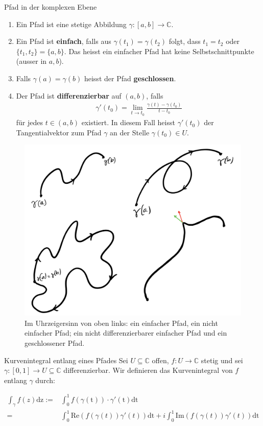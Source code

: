 \documentclass[a4paper,10pt]{article}
\def\Re{\text{Re}}
\def\Im{\text{Im}}
\begin{document}
\begin{mainbox}{Pfad in der komplexen Ebene}
  \begin{enumerate}
    \item Ein Pfad ist eine stetige Abbildung \(\gamma\colon[a,b]\to\mathbb{C}\).
    \item Ein Pfad ist \textbf{einfach}, falls aus \(\gamma(t_1)=\gamma(t_2)\) folgt, dass \(t_1=t_2\) oder \(\{t_1,t_2\}=\{a,b\}\). Das heisst ein einfacher Pfad hat keine Selbstschnittpunkte (ausser in $a,b$).
    \item Falls \(\gamma(a)=\gamma(b)\) heisst der Pfad \textbf{geschlossen}.
    \item Der Pfad ist \textbf{differenzierbar} auf \((a,b)\), falls \begin{align*} \gamma'(t_0)= \lim_{t \to t_0} \frac{\gamma (t) - \gamma (t_0)}{t-t_0} \end{align*} für jedes \(t\in(a,b)\) existiert. In diesem Fall heisst \(\gamma'(t_0)\) der Tangentialvektor zum Pfad \(\gamma\) an der Stelle \(\gamma(t_0)\in U\).
  \end{enumerate}
\end{mainbox}

\begin{figure}[H]
  \centering 
  \includegraphics[width=0.9\linewidth]{assets/paths.png}
  \caption{Im Uhrzeigersinn von oben links: ein einfacher Pfad, ein nicht einfacher Pfad; ein nicht differenzierbarer einfacher Pfad und ein geschlossener Pfad.}
\end{figure}

\begin{mainbox}{Kurvenintegral entlang eines Pfades}
  Sei \(U \subseteq \mathbb{C}\) offen, \(f \colon U \to \mathbb{C}\) stetig und sei \(\gamma \colon [0,1] \to U \subseteq \mathbb{C}\) differenzierbar. Wir definieren das Kurvenintegral von \(f\) entlang \(\gamma\) durch:
  
  \begin{align*} 
  \int_{\gamma} f(z) \text{dz} :=& \int_0^1 f(\gamma(\text{t}))\cdot \gamma'(\text{t}) \text{dt}\\
   = &\int_0^1 \Re(f(\gamma (t))  \gamma'(t) )\text{dt} + i \int_0^1 \Im(f(\gamma (t))  \gamma'(t)) \text{dt}
  \end{align*}
\end{mainbox}
\end{document}
